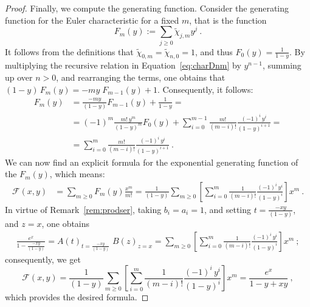 \documentclass{amsart}
\begin{document}
\begin{thm}
\begin{proof}
Finally, we compute the generating function. Consider the generating function for the Euler characteristic for a fixed $m$, that is the function
\[
F_m(y):= \sum_{j\geq 0} \widetilde{\chi}_{j,m}y^j \ .
\]
It follows from the definitions that $\widetilde{\chi}_{0,m}=\widetilde{\chi}_{n,0}=1$, and thus $F_0(y)=\frac{1}{1-y}$.
By multiplying the recursive relation in Equation~\eqref{eq:charDnm} by $y^{n-1}$, summing up over $n>0$, and rearranging the terms, one obtains that  
$(1-y)\, F_m(y)=-m y \;F_{m-1}(y)+1$.
Consequently, it follows: 
\begin{align*}\label{eq:GENcharDnm}F_m(y)&=\frac{-my}{(1-y)}F_{m-1}(y) + \frac{1}{1-y} = \\&= (-1)^m \frac{m!\, y^m}{(1-y)^m}F_0(y)+\sum_{i=0}^{m-1} \frac{ m!}{(m-i)!} \frac{(-1)^i \, y^i}{(1-y)^{i+1}} = \\&=\sum_{i=0}^{m} \frac{ m!}{(m-i)!}\frac{(-1)^i\,y^i}{(1-y)^{i+1}} \ . \end{align*}
We can now find an explicit formula for the exponential generating function of the $F_m(y)$, which means: 
\begin{align*}\mathcal{F}(x,y) &=\sum_{m \geq 0} F_m(y)\frac{x^m}{m!} = %
\frac{1}{(1-y)} \sum_{m \geq 0}\left[\sum_{i=0}^{m} \frac{ 1}{(m-i)!}\frac{(-1)^i\,y^i}{(1-y)^{i}} \right]x^m \ . \end{align*}
In virtue of Remark~\ref{rem:prodser}, taking $b_i=a_i=1$, and setting $t=\frac{-xy}{(1-y)}$, and $z=x$, one obtains
\begin{align*}
\frac{e^x}{1-\frac{-xy}{(1-y)}}=A(t)_{t=\frac{-xy}{(1-y)}}\;B(z)_{z=x} = \sum_{m \geq 0} \left[\sum_{i=0}^{m} \frac{1}{(m-i)!}\frac{(-1)^i\,y^i}{(1-y)^{i}}\right]x^m \ ;
\end{align*}
consequently, we get
\begin{equation*}\label{eq:GenFunBipartite}
\mathcal{F}(x,y) =\frac{1}{(1-y)} \sum_{m \geq 0}\left[\sum_{i=0}^{m} \frac{ 1}{(m-i)!}\frac{(-1)^i\,y^i}{(1-y)^{i}} \right]x^m =\frac{e^x}{1-y+xy} \ , 
\end{equation*}
which provides the desired formula.
\end{proof}
\end{thm}
\end{document}
